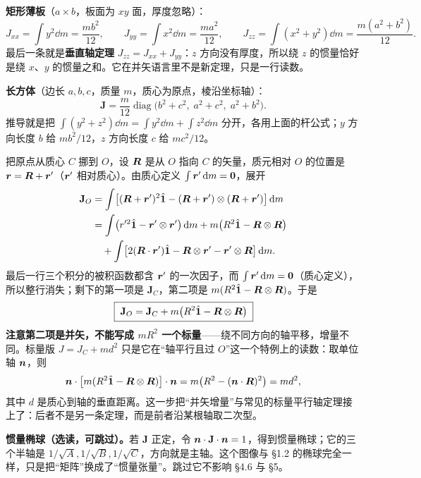 \documentclass[11pt]{ctexart}
\newcommand{\ten}[1]{\mathbf{#1}}
\newcommand{\unitd}{\hat{\ten{1}}}
\let\origsubhdr\subhdr
\renewcommand{\subhdr}[1]{\par\needspace{3\baselineskip}\origsubhdr{#1}}
\begin{document}
\textbf{矩形薄板}（$a\times b$，板面为 $xy$ 面，厚度忽略）：
\[
J_{xx}=\int y^2\dd m=\frac{mb^2}{12},\qquad
J_{yy}=\int x^2\dd m=\frac{ma^2}{12},\qquad
J_{zz}=\int(x^2+y^2)\dd m=\frac{m(a^2+b^2)}{12}.
\]
最后一条就是\textbf{垂直轴定理} $J_{zz}=J_{xx}+J_{yy}$：$z$ 方向没有厚度，所以绕 $z$ 的惯量恰好是绕 $x$、$y$ 的惯量之和。它在并矢语言里不是新定理，只是一行读数。

\textbf{长方体}（边长 $a,b,c$，质量 $m$，质心为原点，棱沿坐标轴）：
\[
\ten J=\frac{m}{12}\operatorname{diag}\bigl(b^2+c^2,\;a^2+c^2,\;a^2+b^2\bigr).
\]
推导就是把 $\int(y^2+z^2)\dd m=\int y^2\dd m+\int z^2\dd m$ 分开，各用上面的杆公式；$y$ 方向长度 $b$ 给 $mb^2/12$，$z$ 方向长度 $c$ 给 $mc^2/12$。

\label{subsec:parallel}

把原点从质心 $C$ 挪到 $O$，设 $\boldsymbol{R}$ 是从 $O$ 指向 $C$ 的矢量，质元相对 $O$ 的位置是 $\boldsymbol{r}=\boldsymbol{R}+\boldsymbol{r}'$（$\boldsymbol{r}'$ 相对质心）。由质心定义 $\int\boldsymbol{r}'\,\mathrm{d} m=\boldsymbol{0}$，展开
\[
\begin{aligned}
\ten J_O&=\int\bigl[(\vect R+\vect r')^2\unitd-(\vect R+\vect r')\otimes(\vect R+\vect r')\bigr]\dd m\\
&=\int\bigl(r'^2\unitd-\vect r'\otimes\vect r'\bigr)\dd m
+m\bigl(R^2\unitd-\vect R\otimes\vect R\bigr)\\
&\quad+\int\bigl[2(\vect R\cdot\vect r')\unitd-\vect R\otimes\vect r'-\vect r'\otimes\vect R\bigr]\dd m .
\end{aligned}
\]
最后一行三个积分的被积函数都含 $\boldsymbol{r}'$ 的一次因子，而 $\int\boldsymbol{r}'\,\mathrm{d} m=\boldsymbol{0}$（质心定义），所以整行消失；剩下的第一项是 $\ten J_C$，第二项是 $m(R^2\unitd-\vect R\otimes\vect R)$。于是
\[
\boxed{\;\ten J_O=\ten J_C+m\bigl(R^2\unitd-\vect R\otimes\vect R\bigr)\;}
\]
\textbf{注意第二项是并矢，不能写成 $mR^2$ 一个标量}——绕不同方向的轴平移，增量不同。标量版 $J=J_C+md^2$ 只是它在“轴平行且过 $O$”这一个特例上的读数：取单位轴 $\boldsymbol{n}$，则
\[
\vect n\cdot\bigl[m(R^2\unitd-\vect R\otimes\vect R)\bigr]\cdot\vect n
=m\bigl(R^2-(\vect n\cdot\vect R)^2\bigr)=m d^2,
\]
其中 $d$ 是质心到轴的垂直距离。这一步把“并矢增量”与常见的标量平行轴定理接上了：后者不是另一条定理，而是前者沿某根轴取二次型。

\textbf{惯量椭球（选读，可跳过）。}若 $\ten J$ 正定，令 $\vect n\cdot\ten J\cdot\vect n=1$，得到惯量椭球；它的三个半轴是 $1/\sqrt{A},1/\sqrt{B},1/\sqrt{C}$，方向就是主轴。这个图像与 \S1.2 的椭球完全一样，只是把“矩阵”换成了“惯量张量”。跳过它不影响 \S4.6 与 \S5。

\label{subsec:inertia-example}
\end{document}

